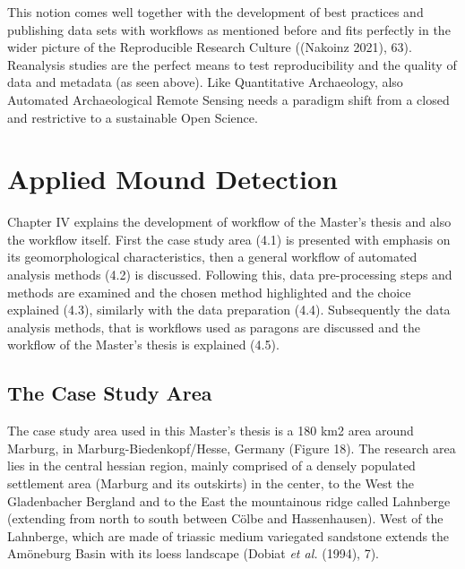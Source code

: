 \documentclass[
  12pt,
]{article}
\begin{document}
This notion comes well together with the development of best practices and publishing data sets with workflows as mentioned before and fits perfectly in the wider picture of the Reproducible Research Culture ((Nakoinz 2021), 63). Reanalysis studies are the perfect means to test reproducibility and the quality of data and metadata (as seen above). Like Quantitative Archaeology, also Automated Archaeological Remote Sensing needs a paradigm shift from a closed and restrictive to a sustainable Open Science.

\newpage

\vspace{5mm}
\justifying

\hypertarget{applied-mound-detection}{%
\section{Applied Mound Detection}\label{applied-mound-detection}}

Chapter IV explains the development of workflow of the Master's thesis and also the workflow itself. First the case study area (4.1) is presented with emphasis on its geomorphological characteristics, then a general workflow of automated analysis methods (4.2) is discussed. Following this, data pre-processing steps and methods are examined and the chosen method highlighted and the choice explained (4.3), similarly with the data preparation (4.4). Subsequently the data analysis methods, that is workflows used as paragons are discussed and the workflow of the Master's thesis is explained (4.5).

\hypertarget{the-case-study-area}{%
\subsection{\texorpdfstring{\textbf{The Case Study Area}}{The Case Study Area}}\label{the-case-study-area}}

The case study area used in this Master's thesis is a 180 km2 area around Marburg, in Marburg-Biedenkopf/Hesse, Germany (Figure 18). The research area lies in the central hessian region, mainly comprised of a densely populated settlement area (Marburg and its outskirts) in the center, to the West the Gladenbacher Bergland and to the East the mountainous ridge called Lahnberge (extending from north to south between Cölbe and Hassenhausen). West of the Lahnberge, which are made of triassic medium variegated sandstone extends the Amöneburg Basin with its loess landscape (Dobiat \emph{et al.} (1994), 7).
\end{document}
